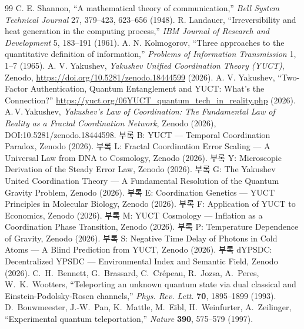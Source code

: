 \documentclass[12pt,a4paper]{article}
\begin{document}
	\begin{thebibliography}{99}
		 C. E. Shannon, ``A mathematical theory of communication,'' \emph{Bell System Technical Journal} 27, 379–423, 623–656 (1948).
		 R. Landauer, ``Irreversibility and heat generation in the computing process,'' \emph{IBM Journal of Research and Development} 5, 183–191 (1961).
		 A. N. Kolmogorov, ``Three approaches to the quantitative definition of information,'' \emph{Problems of Information Transmission} 1, 1–7 (1965).
		 A. V. Yakushev, \emph{Yakushev Unified Coordination Theory (YUCT)}, Zenodo, \url{https://doi.org/10.5281/zenodo.18444599} (2026).
		 A. V. Yakushev, ``Two-Factor Authentication, Quantum Entanglement and YUCT: What's the Connection?'' \url{https://yuct.org/06YUCT_quantum_tech_in_reality.php} (2026).
		 A.\,V.\,Yakushev, \emph{Yakushev's Law of Coordination: The Fundamental Law of Reality as a Fractal Coordination Network}, Zenodo (2026), DOI:10.5281/zenodo.18444598.
		 부록 B: YUCT — Temporal Coordination Paradox, Zenodo (2026).
		 부록 L: Fractal Coordination Error Scaling — A Universal Law from DNA to Cosmology, Zenodo (2026).
		 부록 Y: Microscopic Derivation of the Steady Error Law, Zenodo (2026).
		 부록 G: The Yakushev United Coordination Theory — A Fundamental Resolution of the Quantum Gravity Problem, Zenodo (2026).
		 부록 E: Coordination Genetics — YUCT Principles in Molecular Biology, Zenodo (2026).
		 부록 F: Application of YUCT to Economics, Zenodo (2026).
		 부록 M: YUCT Cosmology — Inflation as a Coordination Phase Transition, Zenodo (2026).
		 부록 P: Temperature Dependence of Gravity, Zenodo (2026).
		 부록 S: Negative Time Delay of Photons in Cold Atoms — A Blind Prediction from YUCT, Zenodo (2026).
		 부록 dYPSDC: Decentralized YPSDC — Environmental Index and Semantic Field, Zenodo (2026).
		 C.~H.~Bennett, G.~Brassard, C.~Crépeau, R.~Jozsa, A.~Peres, W.~K.~Wootters, ``Teleporting an unknown quantum state via dual classical and Einstein-Podolsky-Rosen channels,'' \emph{Phys. Rev. Lett.} \textbf{70}, 1895--1899 (1993).
		 D.~Bouwmeester, J.-W.~Pan, K.~Mattle, M.~Eibl, H.~Weinfurter, A.~Zeilinger, ``Experimental quantum teleportation,'' \emph{Nature} \textbf{390}, 575--579 (1997).

\end{thebibliography}
\end{document}
